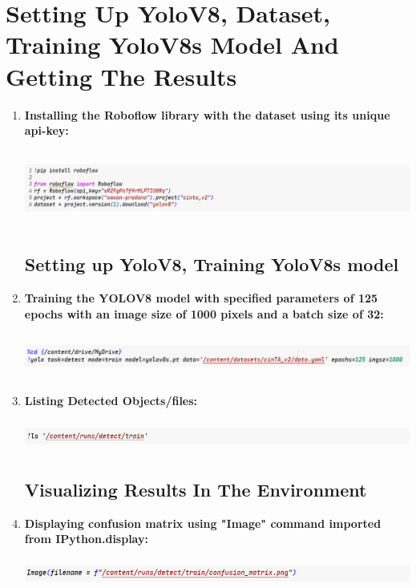 \documentclass[12 pt]{report}
\begin{document}
\section{Setting Up YoloV8, Dataset, Training YoloV8s Model And Getting The Results}
 {
  \begin{enumerate}
    \item \textbf{Installing the Roboflow library with the dataset using its unique api-key:}
          \begin{center}
            \includegraphics[width=17cm, height=2.5cm]{Pip insall roboflow.png}
          \end{center}
          \subsection{Setting up YoloV8, Training YoloV8s model}
    \item \textbf{Training the YOLOV8 model with specified parameters of 125 epochs with an image size of 1000 pixels and a batch size of 32:}
          \begin{center}
            \includegraphics[width=17cm, height=1.5cm]{Training Yolov8model.png}
          \end{center}
    \item \textbf{Listing Detected Objects/files:}
          \begin{center}
            \includegraphics[width=17cm, height=1cm]{Listing out the files created after trining .png}
          \end{center}

          \vspace{1.34cm}
          \subsection{Visualizing Results In The Environment}
    \item \textbf{Displaying confusion matrix using "Image" command imported from IPython.display:}
          \begin{center}
            \includegraphics[width=17cm, height=1cm]{displaying the confusion matrix in environment.png}
          \end{center}


\end{enumerate}}
\end{document}
